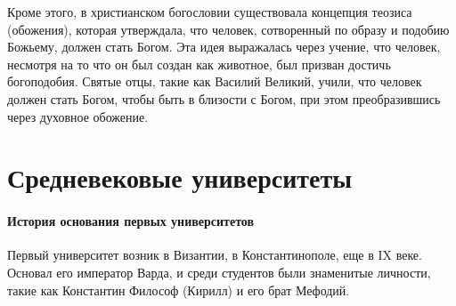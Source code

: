 Кроме этого, в христианском богословии существовала концепция теозиса (обожения), которая утверждала, что человек, сотворенный по образу и подобию Божьему, должен стать Богом. Эта идея выражалась через учение, что человек, несмотря на то что он был создан как животное, был призван достичь богоподобия. Святые отцы, такие как Василий Великий, учили, что человек должен стать Богом, чтобы быть в близости с Богом, при этом преобразившись через духовное обожение.

\section{Средневековые университеты}


\paragraph{История основания первых университетов}
Первый университет возник в Византии, в Константинополе, еще в IX веке. Основал его император Варда, и среди студентов были знаменитые личности, такие как Константин Философ (Кирилл) и его брат Мефодий. 


